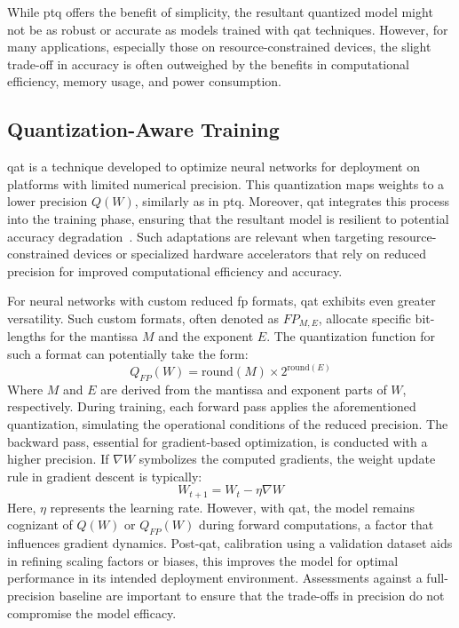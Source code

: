 While \gls{ptq} offers the benefit of simplicity, the resultant quantized model might not be as robust or accurate as models trained with \gls{qat} techniques. However, for many applications, especially those on resource-constrained devices, the slight trade-off in accuracy is often outweighed by the benefits in computational efficiency, memory usage, and power consumption.


\subsection{Quantization-Aware Training}

\gls{qat} is a technique developed to optimize neural networks for deployment on platforms with limited numerical precision. This quantization maps weights to a lower precision \( Q(W) \), similarly as in \gls{ptq}. Moreover, \gls{qat} integrates this process into the training phase, ensuring that the resultant model is resilient to potential accuracy degradation~\cite{krishnamoorthi2018quantizing}. Such adaptations are relevant when targeting resource-constrained devices or specialized hardware accelerators that rely on reduced precision for improved computational efficiency and accuracy.

For neural networks with custom reduced \gls{fp} formats, \gls{qat} exhibits even greater versatility. Such custom formats, often denoted as \( FP_{M,E} \), allocate specific bit-lengths for the mantissa \( M \) and the exponent \( E \). The quantization function for such a format can potentially take the form:
\begin{equation}
Q_{FP}(W) = \text{round}\left(M\right) \times 2^{\text{round}\left(E\right)}
\end{equation}
Where \( M \) and \( E \) are derived from the mantissa and exponent parts of \( W \), respectively.
During training, each forward pass applies the aforementioned quantization, simulating the operational conditions of the reduced precision. The backward pass, essential for gradient-based optimization, is conducted with a higher precision. If \( \nabla W \) symbolizes the computed gradients, the weight update rule in gradient descent is typically:
\begin{equation}
W_{t+1} = W_t - \eta \nabla W
\end{equation}
Here, \( \eta \) represents the learning rate. However, with \gls{qat}, the model remains cognizant of \( Q(W) \) or \( Q_{FP}(W) \) during forward computations, a factor that influences gradient dynamics. Post-\gls{qat}, calibration using a validation dataset aids in refining scaling factors or biases, this improves the model for optimal performance in its intended deployment environment. Assessments against a full-precision baseline are important to ensure that the trade-offs in precision do not compromise the model efficacy.


